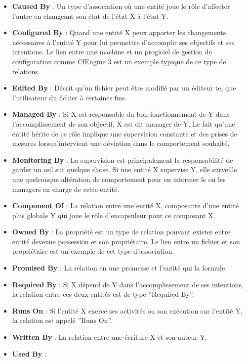 \begin{itemize}
  \item \textbf{Caused By} :
          Un type d'association où une entité joue le rôle d'affecter l'autre en
	  changeant son état de l'état X à l'état Y.
  \item \textbf{Configured By} : 
	  Quand une entité X peux apporter les changements nécessaires à
	  l'entité Y pour lui permettre d'accomplir ses objectifs et ses
	  intentions. Le lien entre une machine et un progiciel de gestion de
	  configuration comme CfEngine 3 est un exemple typique de ce type de
	  relations.
  \item \textbf{Edited By} : 
	  Décrit qu'un fichier peut être modifié par un éditeur tel que
	  l'utilisateur du fichier à certaines fins.
  \item \textbf{Managed By} : 
	  Si X est responsable du bon fonctionnement de Y dans l'accomplissement
	  de son objectif, X est dit manager de Y. Le fait qu'une entité hérite
	  de ce rôle implique une supervision constante et des prises de mesures
	  lorsqu'intervient une déviation dans le comportement souhaité.
  \item \textbf{Monitoring By} : 
	  La supervision est principalement la responsabilité de garder un œil
	  sur quelque chose. Si une entité X supervise Y, elle surveille une
	  quelconque altération de comportement pour en informer le ou les
	  managers en charge de cette entité.
  \item \textbf{Component Of} : 
	  La relation entre une entité X, composante d'une entité plus globale Y
      qui joue le rôle d'encapsuleur pour ce composant X.
  \item \textbf{Owned By} : 
	  La propriété est un type de relation pouvant exister entre entité
	  devenue possession et son propriétaire. Le lien entre un fichier et son
	  propriétaire est un exemple de cet type d'association.
  \item \textbf{Promised By} : 
	  La relation en une promesse et l'entité qui la formule. 
  \item \textbf{Required By} : 
	  Si X dépend de Y dans l'accomplissement de ses intentions, la relation
	  entre ces deux entités est de type ''Required By''.
  \item \textbf{Runs On} : 
	  Si l'entité X exerce ses activités ou son exécution sur l'entité Y, la
	  relation est appelé ''Runs On''.
  \item \textbf{Written By} : 
	  La relation entre une écriture X et son auteur Y.
  \item \textbf{Used By} : 

\end{itemize}
